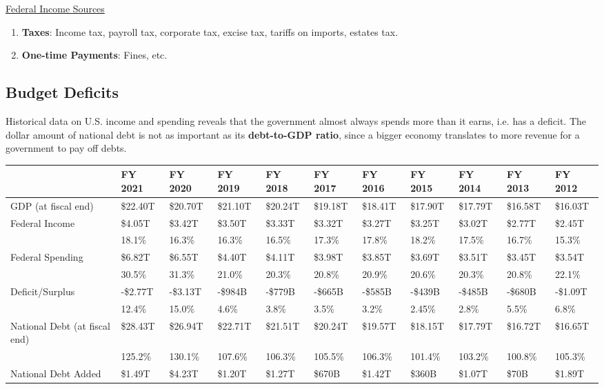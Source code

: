 \documentclass{article}
\begin{document}
    \underline{Federal Income Sources}
    \begin{enumerate}
    \item \textbf{Taxes}: Income tax, payroll tax, corporate tax, excise tax, tariffs on imports, estates tax.
    \item \textbf{One-time Payments}: Fines, etc.
    \end{enumerate}

  \subsection{Budget Deficits}

    Historical data on U.S. income and spending reveals that the government almost always spends more than it earns, i.e. has a deficit. The dollar amount of national debt is not as important as its \textbf{debt-to-GDP ratio}, since a bigger economy translates to more revenue for a government to pay off debts.

    \begin{table}[H]
      \begin{tabular}{|l|l|l|l|l|l|l|l|l|l|l|}
      \hline
      & FY 2021 & FY 2020 & FY 2019 & FY 2018 & FY 2017 & FY 2016 & FY 2015 & FY 2014 & FY 2013 & FY 2012 \\ \hline
      GDP (at fiscal end) & \$22.40T & \$20.70T & \$21.10T & \$20.24T & \$19.18T & \$18.41T & \$17.90T & \$17.79T & \$16.58T & \$16.03T \\ \hline
      Federal Income & \$4.05T & \$3.42T & \$3.50T & \$3.33T & \$3.32T & \$3.27T & \$3.25T & \$3.02T & \$2.77T & \$2.45T \\
      & 18.1\% & 16.3\% & 16.3\% & 16.5\% & 17.3\% & 17.8\% & 18.2\% & 17.5\% & 16.7\% & 15.3\% \\ \hline
      Federal Spending & \$6.82T & \$6.55T & \$4.40T & \$4.11T & \$3.98T & \$3.85T & \$3.69T & \$3.51T & \$3.45T & \$3.54T \\
      & 30.5\% & 31.3\% & 21.0\% & 20.3\% & 20.8\% & 20.9\% & 20.6\% & 20.3\% & 20.8\% & 22.1\% \\ \hline
      Deficit/Surplus & -\$2.77T & -\$3.13T & -\$984B & -\$779B & -\$665B & -\$585B & -\$439B & -\$485B & -\$680B & -\$1.09T \\
      & 12.4\% & 15.0\% & 4.6\% & 3.8\% & 3.5\% & 3.2\% & 2.45\% & 2.8\% & 5.5\% & 6.8\% \\ \hline
      National Debt (at fiscal end) & \$28.43T & \$26.94T & \$22.71T & \$21.51T & \$20.24T & \$19.57T & \$18.15T & \$17.79T & \$16.72T & \$16.65T \\
      & 125.2\% & 130.1\% & 107.6\% & 106.3\% & 105.5\% & 106.3\% & 101.4\% & 103.2\% & 100.8\% & 105.3\% \\ \hline
      National Debt Added & \$1.49T & \$4.23T & \$1.20T & \$1.27T & \$670B & \$1.42T & \$360B & \$1.07T & \$70B & \$1.89T \\ \hline
      \end{tabular}
    \end{table}
\end{document}
